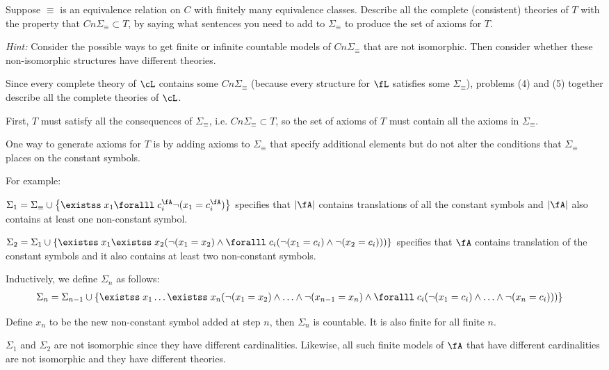 \begin{problem}
  Suppose $\equiv$ is an equivalence relation on $C$ with finitely many
  equivalence classes. Describe all the complete (consistent) theories
  of $T$ with the property that $Cn \Sigma_\equiv \subset T$, by saying
  what sentences you need to add to $\Sigma_\equiv$ to produce the set
  of axioms for $T$.

  \emph{Hint: } Consider the possible ways to get finite or infinite
  countable models of $Cn \Sigma_\equiv$ that are not isomorphic.
  Then consider whether these non-isomorphic structures have
  different theories.

  Since every complete theory of $\cL$ contains some $Cn \Sigma_\equiv$
  (because every structure for $\fL$ satisfies some $\Sigma_\equiv$),
  problems (4) and (5) together describe all the complete theories of $\cL$.

\end{problem}
\begin{Answer}
  First, $T$ must satisfy all the consequences of $\Sigma_\equiv$, i.e.
  $Cn \Sigma_\equiv \subset T$, so the set of axioms of $T$ must contain all
  the axioms in $\Sigma_\equiv$.
  
  One way to generate axioms for $T$ is by adding axioms to $\Sigma_\equiv$
  that specify additional elements but do not alter the conditions that
  $\Sigma_\equiv$ places on the constant symbols.

  \step
  For example:

  \begin{enumroman}
    \item $\Sigma_1 = \Sigma_\equiv \cup
      \set{ \exists x_1 \forall c_i^\fA \lnot (x_1 = c_i^\fA) }$
      specifies that $\abs{\fA}$ contains translations of
      all the constant symbols and $\abs{\fA}$ also contains
      at least one non-constant symbol.
    \item $\Sigma_2 = \Sigma_1 \cup \set{
      \exists x_1 \exists x_2 ( \lnot (x_1 = x_2) \land
      \forall c_i (\lnot (x_1 = c_i) \land \lnot (x_2 = c_i)))}$
      specifies that $\fA$ contains translation of the constant symbols
      and it also contains at least two non-constant symbols.
    \item Inductively, we define $\Sigma_n$ as follows:
      \begin{align*}
        \Sigma_n &= \Sigma_{n-1} \cup \set{
          \exists x_1 \ldots \exists x_n
          ( \lnot (x_1 = x_2) \land \ldots \land \lnot (x_{n-1} = x_n) \land
          \forall c_i (\lnot (x_1 = c_i) \land \ldots \land
          \lnot (x_n = c_i)))}
      \end{align*}
      
      Define $x_n$ to be the new non-constant symbol
      added at step $n$, then $\Sigma_n$ is countable.
      It is also finite for all finite $n$.
  \end{enumroman}
  $\Sigma_1$ and $\Sigma_2$ are not isomorphic since they have different
    cardinalities. Likewise, all such finite models of $\fA$ 
    that have different cardinalities are not isomorphic and they
    have different theories.


\end{Answer}
